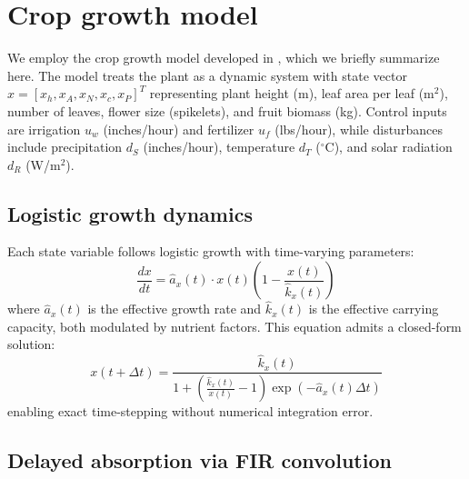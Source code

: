 \documentclass[preprint,12pt]{elsarticle}
\newcommand{\df}[2]{\displaystyle\frac{#1}{#2}}
\begin{document}
\section{Crop growth model}\label{sec:dynamics}

We employ the crop growth model developed in \cite{becker2025ga}, which we briefly summarize here. The model treats the plant as a dynamic system with state vector $x = [x_{h}, x_{A}, x_{N}, x_{c}, x_{P}]^T$ representing plant height (m), leaf area per leaf (m$^2$), number of leaves, flower size (spikelets), and fruit biomass (kg). Control inputs are irrigation $u_w$ (inches/hour) and fertilizer $u_f$ (lbs/hour), while disturbances include precipitation $d_{S}$ (inches/hour), temperature $d_{T}$ ($^\circ$C), and solar radiation $d_{R}$ (W/m$^2$).

\subsection{Logistic growth dynamics}\label{subsec:logistic}

Each state variable follows logistic growth with time-varying parameters:
\begin{equation}
\df{dx}{dt} = \hat{a}_x(t) \cdot x(t) \left(1 - \df{x(t)}{\hat{k}_x(t)}\right)
\label{eqn:logistic}
\end{equation}
where $\hat{a}_x(t)$ is the effective growth rate and $\hat{k}_x(t)$ is the effective carrying capacity, both modulated by nutrient factors. This equation admits a closed-form solution:
\begin{equation}
x(t + \Delta t) = \df{\hat{k}_x(t)}{1 + \left(\df{\hat{k}_x(t)}{x(t)} - 1\right)\exp(-\hat{a}_x(t)\Delta t)}
\label{eqn:closed-form}
\end{equation}
enabling exact time-stepping without numerical integration error.

\subsection{Delayed absorption via FIR convolution}\label{subsec:fir}
\end{document}
